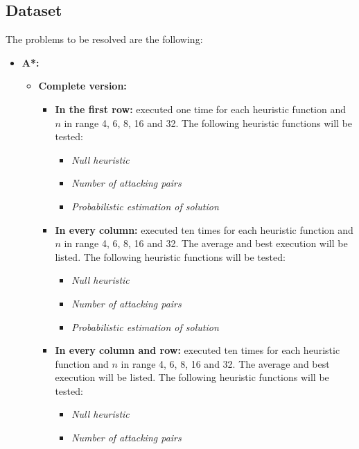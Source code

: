 \documentclass[]{llncs}
\begin{document}
\subsection{Dataset}\label{dataset}
The problems to be resolved are the following:
\begin{itemize}
    \item \textbf{A*:}
        \begin{itemize}
            \item \textbf{Complete version:}
                \begin{itemize}
                    \item \textbf{In the first row:} executed one time for each heuristic function and $n$ in range 4, 6, 8, 16 and 32. The following heuristic functions will be tested:
                        \begin{itemize}
                            \item \textit{Null heuristic}
                            \item \textit{Number of attacking pairs}
                            \item \textit{Probabilistic estimation of solution}
                        \end{itemize}
                    \item \textbf{In every column:} executed ten times for each heuristic function and $n$ in range 4, 6, 8, 16 and 32. The average and best execution will be listed. The following heuristic functions will be tested:
                        \begin{itemize}
                            \item \textit{Null heuristic}
                            \item \textit{Number of attacking pairs}
                            \item \textit{Probabilistic estimation of solution}
                        \end{itemize}
                    \item \textbf{In every column and row:} executed ten times for each heuristic function and $n$ in range 4, 6, 8, 16 and 32. The average and best execution will be listed. The following heuristic functions will be tested:
                        \begin{itemize}
                            \item \textit{Null heuristic}
                            \item \textit{Number of attacking pairs}

\end{itemize}
\end{itemize}
\end{itemize}
\end{itemize}
\end{document}
